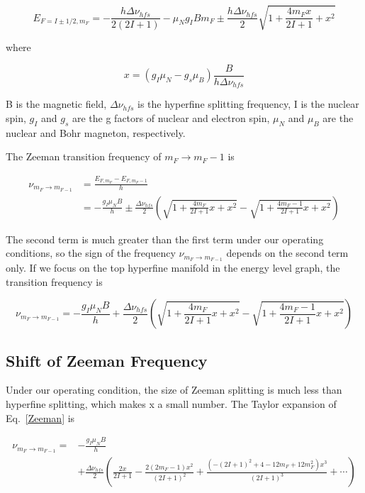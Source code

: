 \begin{equation}
E_{F=I\pm 1/2, m_{F}}=-\frac{h\Delta \nu_{hfs}}{2(2I+1)}-\mu_{N}g_{I}Bm_{F}\pm \frac{h\Delta \nu_{hfs}}{2}\sqrt{1+\frac{4m_{F}x}{2I+1} +x^{2}}
\end{equation}

where

\begin{equation}
x=(g_{I}\mu_{N}-g_{s}\mu_{B})\frac{B}{h\Delta \nu_{hfs}}
\end{equation}

B is the magnetic field, $\Delta \nu_{hfs}$ is the hyperfine splitting frequency, I is the nuclear spin, $g_{I}$ and $g_{s}$ are the g factors of nuclear and electron spin, $\mu_{N}$ and $\mu_{B}$ are the nuclear and Bohr magneton, respectively. 

The Zeeman transition frequency of $m_{F} \rightarrow m_{F} - 1$ is 

\begin{equation}
\begin{split}
\nu_{m_{F}\rightarrow m_{F-1}} &=\frac{E_{F,m_{F}}-E_{F,m_{F}-1}}{h} \\
&= -\frac{g_{I}\mu_{N}B}{h}\pm \frac{\Delta \nu_{hfs}}{2}\left(\sqrt{1+\frac{4m_{F}}{2I+1}x+x^{2}}-\sqrt{1+\frac{4m_{F}-1}{2I+1}x+x^{2}}\right)
\end{split}
\end{equation}

The second term is much greater than the first term under our operating conditions, so the sign of the frequency $\nu_{m_{F}\rightarrow m_{F-1}}$ depends on the second term only. If we focus on the top hyperfine manifold in the energy level graph, the transition frequency is

\begin{equation}\label{Zeeman}
\nu_{m_{F}\rightarrow m_{F-1}} = -\frac{g_{I}\mu_{N}B}{h}+ \frac{\Delta \nu_{hfs}}{2}\left(\sqrt{1+\frac{4m_{F}}{2I+1}x+x^{2}}-\sqrt{1+\frac{4m_{F}-1}{2I+1}x+x^{2}}\right)
\end{equation}

\subsection{Shift of Zeeman Frequency}

Under our operating condition, the size of Zeeman splitting is much less than hyperfine splitting, which makes x a small number. The Taylor expansion of Eq.~\ref{Zeeman} is

\begin{equation}\label{Taylorwithx}
\begin{split}
\nu_{m_{F}\rightarrow m_{F-1}}=&-\frac{g_{I}\mu_{N}B}{h}\\
&+\frac{\Delta\nu_{hfs}}{2}\left(\frac{2x}{2I+1}-\frac{2(2m_{F}-1)x^{2}}{(2I+1)^{2}}+\frac{(-(2I+1)^{2}+4-12m_{F}+12m_{F}^{2})x^{3}}{(2I+1)^{3}}+\cdots\right)
\end{split}
\end{equation}
 
